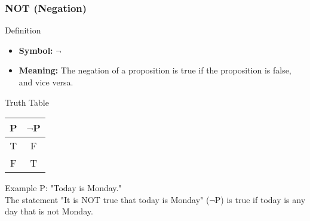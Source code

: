\documentclass[aspectratio=169]{beamer}
\begin{document}
\begin{frame}[fragile]
    \frametitle{NOT (Negation)}
    \begin{block}{Definition}
        \begin{itemize}
            \item \textbf{Symbol:} $\neg$
            \item \textbf{Meaning:} The negation of a proposition is true if the proposition is false, and vice versa.
        \end{itemize}
    \end{block}
    \begin{block}{Truth Table}
        \begin{center}
            \begin{tabular}{|c|c|}
                \hline
                P & $\neg$P \\
                \hline
                T & F \\
                F & T \\
                \hline
            \end{tabular}
        \end{center}
    \end{block}
    \begin{block}{Example}
        P: "Today is Monday." \\
        The statement "It is NOT true that today is Monday" ($\neg$P) is true if today is any day that is not Monday.
    \end{block}
\end{frame}
\end{document}
